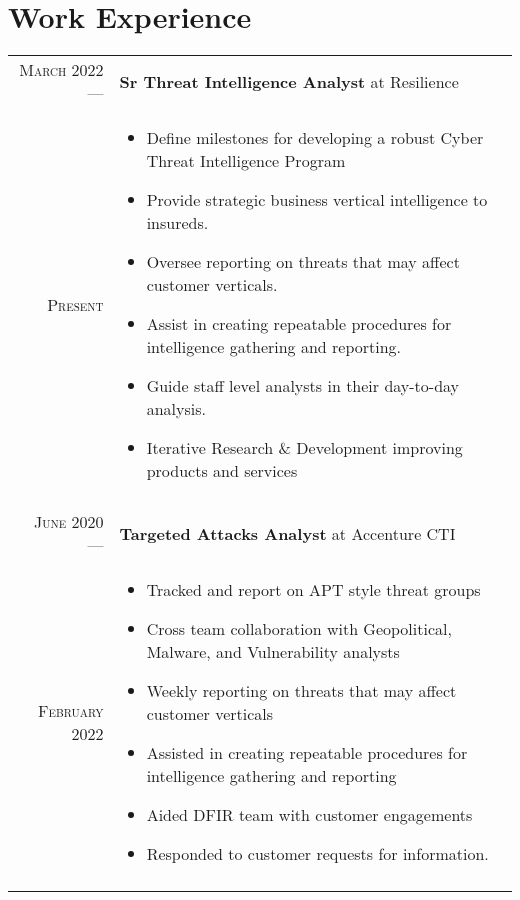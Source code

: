 \documentclass[a4paper,10pt]{article}
\begin{document}
\newpage

\section{Work Experience}
\begin{tabular}{r|p{11cm}}

 \textsc{March 2022} ---            & \textbf {Sr Threat Intelligence Analyst} at Resilience \\
 \textsc{Present} \hphantom{---} & \footnotesize{
        \vspace{-2mm}
        \begin{itemize}[leftmargin=*]
            \item Define milestones for developing a robust Cyber Threat Intelligence Program
            \item Provide strategic business vertical intelligence to insureds.
            \item Oversee reporting on threats that may affect customer verticals.
            \item Assist in creating repeatable procedures for intelligence gathering and reporting.
            \item Guide staff level analysts in their day-to-day analysis.
            \item Iterative Research \& Development improving products and services
        \end{itemize}
        \vspace*{-\baselineskip}
    }\\
 \multicolumn{2}{c}{} \\


 \textsc{June 2020} ---            & \textbf {Targeted Attacks Analyst} at Accenture CTI \\
 \textsc{February 2022} \hphantom{---} & \footnotesize{
        \vspace{-2mm}
        \begin{itemize}[leftmargin=*]
            \item Tracked and report on APT style threat groups
            \item Cross team collaboration with Geopolitical, Malware, and Vulnerability analysts 
            \item Weekly reporting on threats that may affect customer verticals
            \item Assisted in creating repeatable procedures for intelligence gathering and reporting
            \item Aided DFIR team with customer engagements
            \item Responded to customer requests for information. 
        \end{itemize}
        \vspace*{-\baselineskip}
    }\\
 \multicolumn{2}{c}{} \\


\end{tabular}
\end{document}
